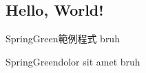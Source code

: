 \documentclass{article}
\begin{document}

\begin{large}

\section{Hello, World!}
\begin{boxpar}{SpringGreen}{範例程式}
    bruh
\end{boxpar}

\begin{boxpar}{SpringGreen}{dolor sit amet}
    bruh
\end{boxpar}

\end{large}
\end{document}
